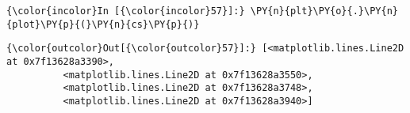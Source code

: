     \begin{Verbatim}[commandchars=\\\{\}]
{\color{incolor}In [{\color{incolor}57}]:} \PY{n}{plt}\PY{o}{.}\PY{n}{plot}\PY{p}{(}\PY{n}{cs}\PY{p}{)}
\end{Verbatim}

            \begin{Verbatim}[commandchars=\\\{\}]
{\color{outcolor}Out[{\color{outcolor}57}]:} [<matplotlib.lines.Line2D at 0x7f13628a3390>,
          <matplotlib.lines.Line2D at 0x7f13628a3550>,
          <matplotlib.lines.Line2D at 0x7f13628a3748>,
          <matplotlib.lines.Line2D at 0x7f13628a3940>]
\end{Verbatim}
        
    \begin{center}
    \end{center}
    { \hspace*{\fill} \\}
